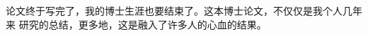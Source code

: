\ifx\atempxetex\usewhat
\fi
{}


论文终于写完了，我的博士生涯也要结束了。这本博士论文，不仅仅是我个人几年来
研究的总结，更多地，这是融入了许多人的心血的结果。




%
%
%
%
%
%
%
